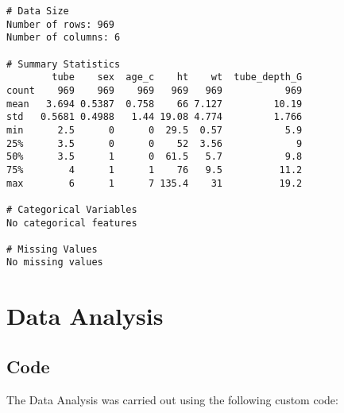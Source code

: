 \documentclass[11pt]{article}
\begin{document}
\begin{Verbatim}[tabsize=4]
# Data Size
Number of rows: 969
Number of columns: 6

# Summary Statistics
        tube    sex  age_c    ht    wt  tube_depth_G
count    969    969    969   969   969           969
mean   3.694 0.5387  0.758    66 7.127         10.19
std   0.5681 0.4988   1.44 19.08 4.774         1.766
min      2.5      0      0  29.5  0.57           5.9
25%      3.5      0      0    52  3.56             9
50%      3.5      1      0  61.5   5.7           9.8
75%        4      1      1    76   9.5          11.2
max        6      1      7 135.4    31          19.2

# Categorical Variables
No categorical features

# Missing Values
No missing values

\end{Verbatim}

\section{Data Analysis}
\subsection{{Code}}
The Data Analysis was carried out using the following custom code:
\end{document}
